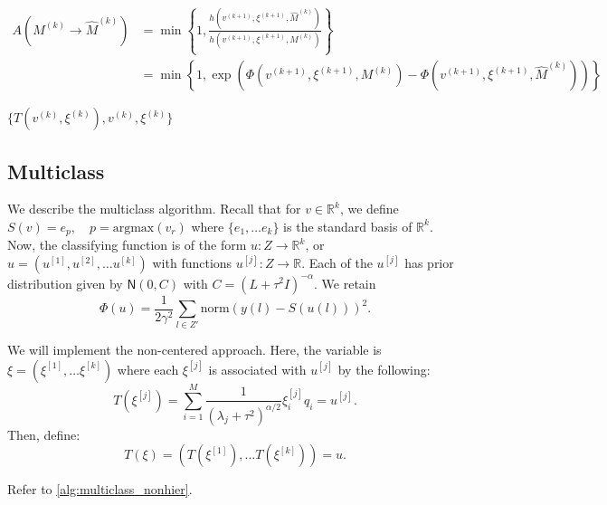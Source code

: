 \documentclass{siamart1116}
\begin{document}
\begin{algorithm}
\begin{algorithmic}[1]
        \begin{align*}
        A(M^{(k)} \to \hat M^{(k)}) &= \min\left\{1, \frac{h( v^{(k+1)}, \xi^{(k+1)}, \hat M^{(k)}  )}{h( v^{(k+1)}, \xi^{(k+1)}, M^{(k)} )} \right\}\\
        &=\min\left\{1, \exp\left(\Phi(v^{(k+1)}, \xi^{(k+1)}, M^{(k)} ) - \Phi(v^{(k+1)}, \xi^{(k+1)}, \hat M^{(k)} )\right)\right\}
        \end{align*}

        \EndFor
        \State \Return $\{ T(v^{(k)},\xi^{(k)}), v^{(k)}, \xi^{(k)} \}$
        \end{algorithmic}
        \end{algorithm}

    \subsection{Multiclass}
        We describe the multiclass algorithm. Recall that for $v \in \mathbb{R}^k$, we define $S(v) = e_p, \quad p = \text{argmax} (v_r)$ where $\{e_1, \ldots e_k\}$ is the standard basis of $\mathbb{R}^k$. Now, the classifying function is of the form $u: Z \to \mathbb{R}^k$, or $u = (u^{[1]}, u^{[2]}, \ldots u^{[k]})$ with functions $u^{[j]}: Z \to \mathbb{R}$. Each of the $u^{[j]}$ has prior distribution given by $\mathsf{N}(0, C)$ with $C = (L + \tau^2 I)^{-\alpha}$. We retain
        \[ \Phi(u) = \frac{1}{2\gamma^2}\sum_{l \in Z'} \text{norm}(y(l) - S(u(l)))^2. \]

        We will implement the non-centered approach. Here, the variable is $\xi = (\xi^{[1]}, \ldots \xi^{[k]})$ where each $\xi^{[j]}$ is associated with $u^{[j]}$ by the following:
        \[T(\xi^{[j]}) = \sum_{i=1}^M \frac{1}{(\lambda_j + \tau^2)^{\alpha/2}} \xi^{[j]}_i q_i = u^{[j]}.\]
        Then, define:
        \begin{equation}
        \label{eqn:multiclass_T}
        T(\xi) = (T(\xi^{[1]}), \ldots T(\xi^{[k]}) ) = u.
        \end{equation}

        Refer to \cref{alg:multiclass_nonhier}.
        
\end{document}
